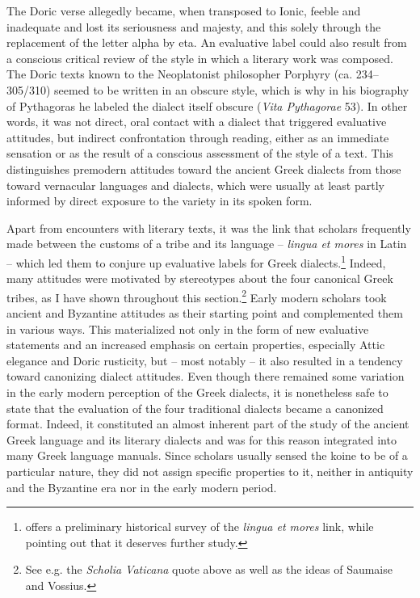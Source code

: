 The Doric verse allegedly became, when transposed to Ionic, feeble and inadequate and lost its seriousness and majesty, and this solely through the replacement of the letter alpha by eta. An evaluative label could also result from a conscious critical review of the style in which a literary work was composed. The Doric texts known to the Neoplatonist philosopher Porphyry (ca. 234–305/310) seemed to be written in an obscure style, which is why in his biography of Pythagoras he labeled the dialect itself obscure (\textit{Vita Pythagorae} 53). In other words, it was not direct, oral contact with a dialect that triggered evaluative attitudes, but indirect confrontation through reading, either as an immediate sensation or as the result of a conscious assessment of the style of a text. This distinguishes premodern attitudes toward the ancient Greek dialects from those toward vernacular languages and dialects, which were usually at least partly informed by direct exposure to the variety in its spoken form.

Apart from encounters with literary texts, it was the link that scholars frequently made between the customs of a tribe and its language – \textit{lingua et mores} in Latin – which led them to conjure up evaluative labels for Greek dialects.\footnote{\citet{VanHal2013} offers a preliminary historical survey of the \textit{lingua et mores} link, while pointing out that it deserves further study.} Indeed, many attitudes were motivated by stereotypes about the four canonical Greek tribes, as I have shown throughout this section.\footnote{See e.g. the \textit{Scholia Vaticana} quote above as well as the ideas of Saumaise and Vossius.} Early modern scholars took ancient and Byzantine attitudes as their starting point and complemented them in various ways. This materialized not only in the form of new evaluative statements and an increased emphasis on certain properties, especially Attic elegance and Doric rusticity, but – most notably – it also resulted in a tendency toward canonizing dialect attitudes. Even though there remained some variation in the early modern perception of the Greek dialects, it is nonetheless safe to state that the evaluation of the four traditional dialects became a canonized format. Indeed, it constituted an almost inherent part of the study of the ancient Greek language and its literary dialects and was for this reason integrated into many Greek language manuals. Since scholars usually sensed the koine to be of a particular nature, they did not assign specific properties to it, neither in antiquity and the Byzantine era nor in the early modern period.

